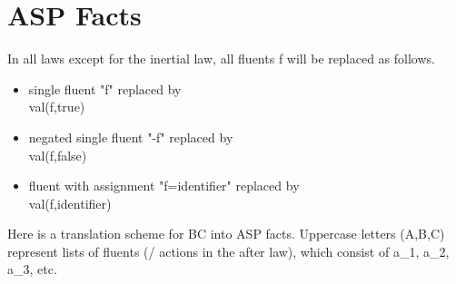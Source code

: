 \documentclass[10pt,a4paper]{article}
\begin{document}
\section{ASP Facts}
In all laws except for the inertial law,
all fluents f will be replaced as follows.
\begin{itemize}
\item single fluent "f" replaced by\\
    val(f,true)
\item negated single fluent "-f" replaced by\\
    val(f,false)
\item fluent with assignment "f=identifier" replaced by\\
    val(f,identifier)
\end{itemize}
Here is a translation scheme for BC into ASP facts.
Uppercase letters (A,B,C) represent lists of fluents (/ actions in the after law),
which consist of a\_1, a\_2, a\_3, etc.  
\end{document}
